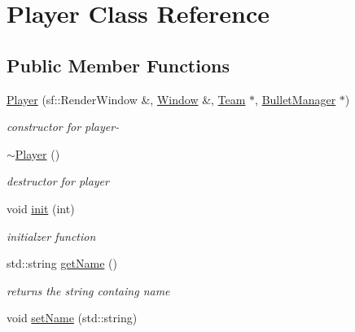 \hypertarget{class_player}{\section{Player Class Reference}
\label{class_player}
}
\subsection*{Public Member Functions}
\begin{DoxyCompactItemize}
\item 
\hypertarget{class_player_a924d93fdd5eacf42b24136adc91cef6a}{\hyperlink{class_player_a924d93fdd5eacf42b24136adc91cef6a}{Player} (sf\+::\+Render\+Window \&, \hyperlink{class_window}{Window} \&, \hyperlink{class_team}{Team} $\ast$, \hyperlink{class_bullet_manager}{Bullet\+Manager} $\ast$)}\label{class_player_a924d93fdd5eacf42b24136adc91cef6a}

\begin{DoxyCompactList}\small\item\em constructor for player-\/ \end{DoxyCompactList}\item 
\hypertarget{class_player_a749d2c00e1fe0f5c2746f7505a58c062}{\hyperlink{class_player_a749d2c00e1fe0f5c2746f7505a58c062}{$\sim$\+Player} ()}\label{class_player_a749d2c00e1fe0f5c2746f7505a58c062}

\begin{DoxyCompactList}\small\item\em destructor for player \end{DoxyCompactList}\item 
\hypertarget{class_player_a58ee51afc7fe40de5d53a115a4d393fc}{void \hyperlink{class_player_a58ee51afc7fe40de5d53a115a4d393fc}{init} (int)}\label{class_player_a58ee51afc7fe40de5d53a115a4d393fc}

\begin{DoxyCompactList}\small\item\em initialzer function \end{DoxyCompactList}\item 
\hypertarget{class_player_af1aa472885d589516f483e26e786600e}{std\+::string \hyperlink{class_player_af1aa472885d589516f483e26e786600e}{get\+Name} ()}\label{class_player_af1aa472885d589516f483e26e786600e}

\begin{DoxyCompactList}\small\item\em returns the string containg name \end{DoxyCompactList}\item 
\hypertarget{class_player_ad5d0fe61be553629eec2572c049048ed}{void \hyperlink{class_player_ad5d0fe61be553629eec2572c049048ed}{set\+Name} (std\+::string)}\label{class_player_ad5d0fe61be553629eec2572c049048ed}


\end{DoxyCompactItemize}
